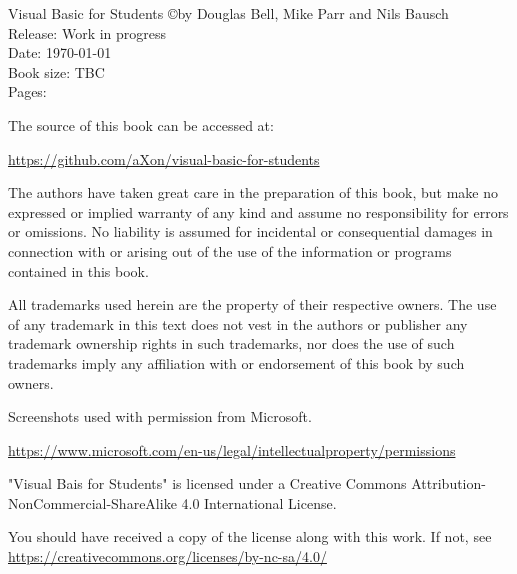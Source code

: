 %
%

{\footnotesize
\noindent
Visual Basic for Students \copyright by Douglas Bell, Mike Parr and Nils Bausch\\
Release: Work in progress \\
Date: \today\\
Book size: TBC \\ %
Pages: \ztotpages\\
\vspace{20pt}

\noindent
The source of this book can be accessed at:

\noindent
\url{https://github.com/aXon/visual-basic-for-students}

\vspace{15pt}

\noindent
The authors have taken great care in the preparation of this book, but make no expressed or implied warranty of any kind and assume no responsibility for errors or omissions. No liability is assumed for incidental or consequential damages in connection with or arising out of the use of the information or programs contained in this book.

\vspace{15pt}

\noindent
All trademarks used herein are the property of their respective owners. The use of any trademark in this text does not vest in the authors or publisher any trademark ownership rights in such trademarks, nor does the use of such trademarks imply any affiliation with or endorsement of this book by such owners.

\vspace{15pt}

\noindent
Screenshots used with permission from Microsoft.

\noindent
\url{https://www.microsoft.com/en-us/legal/intellectualproperty/permissions}

\vspace{15pt}


\noindent
\doclicenseIcon
"Visual Bais for Students" is licensed under a Creative Commons Attribution-NonCommercial-ShareAlike 4.0 International License.

You should have received a copy of the license along with this work. If not, see
\noindent
\url{https://creativecommons.org/licenses/by-nc-sa/4.0/}

}
